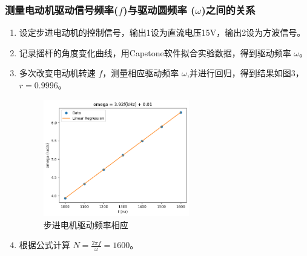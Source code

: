 \documentclass[UTF8]{ctexart}
\begin{document}
\subsubsection{测量电动机驱动信号频率($f$)与驱动圆频率 ($\omega$)之间的关系}
\begin{enumerate}
    \item 设定步进电动机的控制信号，输出1设为直流电压15V，输出2设为方波信号。
    \item 记录摇杆的角度变化曲线，用Capstone软件拟合实验数据，得到驱动频率 $\omega$。
    \item 多次改变电动机转速 $f$，测量相应驱动频率 $\omega$,并进行回归，得到结果如图3，\(r=0.9996\)。
    \begin{figure}[htbp]
        \centering
        \includegraphics[width=0.6\textwidth]{drive.png}
        \caption{步进电机驱动频率相应}
        \label{fig:drive}
    \end{figure}
    
    \item 根据公式计算 $N = \frac{2\pi f}{\omega}=1600$。
\end{enumerate}
\end{document}
